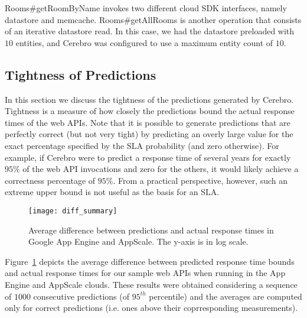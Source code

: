 Rooms\#getRoomByName
invokes two different cloud SDK interfaces, namely datastore and memcache.
Rooms\#getAllRooms is another operation that consists of an iterative
datastore read. In this case, we had the datastore preloaded with $10$ entities,
and Cerebro was configured to use a maximum entity count of $10$. 

\subsection{Tightness of Predictions}

In this section we discuss the tightness of the predictions generated by Cerebro. Tightness is a measure of how closely the predictions
bound the actual response times of the web APIs. 
Note that it is possible to generate predictions that are perfectly correct
(but not very tight)
by predicting an overly large value for the exact percentage specified by the
SLA probability (and zero otherwise).  For example, if Cerebro were to
predict a response time of several years for exactly $95\%$ of the web API
invocations and zero for the others, it would likely
achieve a correctness percentage of $95\%$.  From a practical perspective,
however, such an extreme upper bound is not useful as the basis for an SLA. 

\begin{figure}
\centering
\texttt{[image: diff\_summary]}
\caption{Average difference between predictions and actual response times in
Google App Engine and AppScale. The y-axis is in log scale.}
\label{fig:diff_summary}
\end{figure}

Figure~\ref{fig:diff_summary} depicts the average difference between predicted
response time bounds and actual response times for
our sample web APIs when running in the App Engine and AppScale clouds. 
These results were obtained considering a sequence of $1000$ 
consecutive predictions (of $95^{th}$ percentile) and the averages are
computed only for correct predictions (i.e. ones above their coprresponding
measurements).

